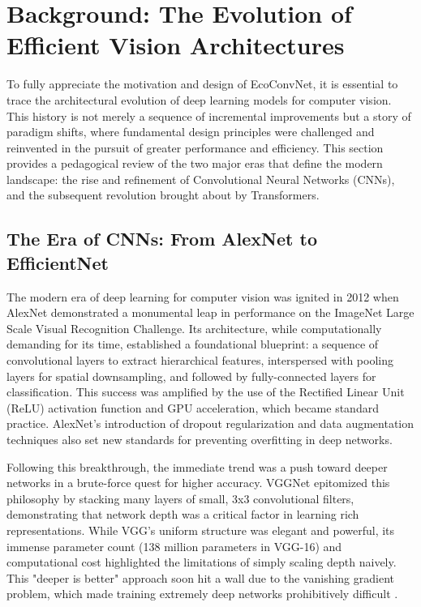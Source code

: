 \documentclass[12pt, a4paper]{article}
\begin{document}
\section{Background: The Evolution of Efficient Vision Architectures}
\label{sec:background}

To fully appreciate the motivation and design of EcoConvNet, it is essential to trace the architectural evolution of deep learning models for computer vision. This history is not merely a sequence of incremental improvements but a story of paradigm shifts, where fundamental design principles were challenged and reinvented in the pursuit of greater performance and efficiency. This section provides a pedagogical review of the two major eras that define the modern landscape: the rise and refinement of Convolutional Neural Networks (CNNs), and the subsequent revolution brought about by Transformers.

\subsection{The Era of CNNs: From AlexNet to EfficientNet}
\label{ssec:cnn_era}

The modern era of deep learning for computer vision was ignited in 2012 when AlexNet \cite{krizhevsky2012imagenet} demonstrated a monumental leap in performance on the ImageNet Large Scale Visual Recognition Challenge. Its architecture, while computationally demanding for its time, established a foundational blueprint: a sequence of convolutional layers to extract hierarchical features, interspersed with pooling layers for spatial downsampling, and followed by fully-connected layers for classification. This success was amplified by the use of the Rectified Linear Unit (ReLU) activation function \cite{nair2010rectified} and GPU acceleration, which became standard practice. AlexNet's introduction of dropout regularization \cite{srivastava2014dropout} and data augmentation techniques also set new standards for preventing overfitting in deep networks.

Following this breakthrough, the immediate trend was a push toward deeper networks in a brute-force quest for higher accuracy. VGGNet \cite{simonyan2014very} epitomized this philosophy by stacking many layers of small, 3x3 convolutional filters, demonstrating that network depth was a critical factor in learning rich representations. While VGG's uniform structure was elegant and powerful, its immense parameter count (138 million parameters in VGG-16) and computational cost highlighted the limitations of simply scaling depth naively. This "deeper is better" approach soon hit a wall due to the vanishing gradient problem, which made training extremely deep networks prohibitively difficult \cite{glorot2010understanding}.
\end{document}
